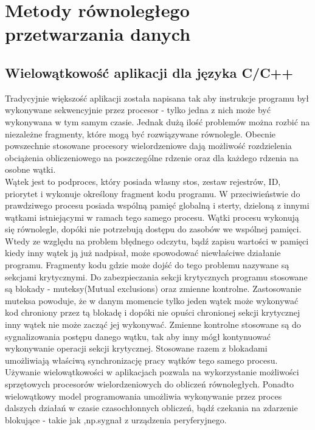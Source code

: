 \documentclass[document.tex]{subfiles}
\begin{document}
\chapter{Metody równoległego przetwarzania danych}

\section{Wielowątkowość aplikacji dla języka C/C++}
\indent Tradycyjnie większość aplikacji została napisana 
tak aby instrukcje programu był wykonywane sekwencyjnie przez
procesor - tylko jedna z nich może być wykonywana w tym samym czasie.
Jednak dużą ilość problemów można rozbić na niezależne fragmenty,
 które mogą być rozwiązywane równolegle. Obecnie powszechnie stosowane procesory
 wielordzeniowe dają możliwość rozdzielenia obciążenia obliczeniowego na poszczególne rdzenie oraz dla każdego rdzenia na osobne wątki.\cite{Computer_Architecture_Patterson_Hennesy}\cite{Parallel_computing_article} \\
 \indent Wątek jest to podproces, który posiada własny stos, zestaw rejestrów, ID, priorytet i wykonuje określony fragment kodu programu. W przeciwieństwie do prawdziwego procesu posiada wspólną pamięć globalną i sterty, dzieloną z innymi wątkami istniejącymi w ramach tego samego procesu. Wątki procesu wykonują się równolegle, dopóki nie potrzebują dostępu do zasobów we wspólnej pamięci.\cite{POSIX_article}\cite{POSIX_tutorial} Wtedy ze względu na problem błędnego odczytu, bądź zapisu wartości w pamięci kiedy inny wątek ją już nadpisał, może spowodować niewłaściwe działanie programu. Fragmenty kodu gdzie może dojść do tego problemu nazywane są sekcjami krytycznymi. Do zabezpieczania sekcji krytycznych programu stosowane są blokady - muteksy(Mutual exclusions) oraz zmienne kontrolne. Zastosowanie muteksa powoduje, że w danym momencie tylko jeden wątek może wykonywać kod chroniony przez tą blokadę i dopóki nie opuści chronionej sekcji krytycznej inny wątek nie może zacząć jej wykonywać. Zmienne kontrolne stosowane są do sygnalizowania postępu danego wątku, tak aby inny mógł kontynuować wykonywanie operacji sekcji krytycznej. Stosowane razem z blokadami umożliwiają właściwą synchronizację pracy wątków tego samego procesu.
\cite{POSIX_Butenhof}\cite{C++_Stroustrup}
\indent Używanie wielowątkowości w aplikacjach pozwala na wykorzystanie możliwości sprzętowych procesorów wielordzeniowych do obliczeń równoległych.
Ponadto wielowątkowy model programowania umożliwia wykonywanie przez proces dalszych działań w czasie czasochłonnych obliczeń, bądź czekania na zdarzenie blokujące - takie jak ,np.sygnał z urządzenia peryferyjnego.
\end{document}
